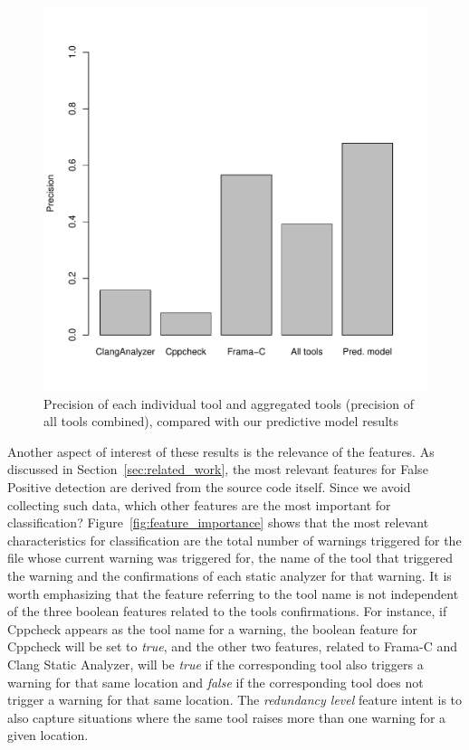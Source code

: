 \begin{figure}
\centering
\includegraphics[width=.75\textwidth]{figures/precisions.pdf}
  \caption{Precision of each individual tool and aggregated tools (precision of all tools combined), compared with our predictive model results}\label{fig:precisions}
\end{figure}

Another aspect of interest of these results is the relevance of the features.
As discussed in Section~\ref{sec:related_work}, the most relevant features for
False Positive detection are derived from the source code itself. Since we
avoid collecting such data, which other features are the most important for
classification?  Figure~\ref{fig:feature_importance} shows that the most
relevant characteristics for classification are the total number of warnings
triggered for the file whose current warning was triggered for, the name of the
tool that triggered the warning and the confirmations of each static analyzer
for that warning. It is worth emphasizing that the feature referring to the
tool name is not independent of the three boolean features related to the tools
confirmations. For instance, if Cppcheck appears as the tool name for a warning,
the boolean feature for Cppcheck will be set to \emph{true}, and the other two
features, related to Frama-C and Clang Static Analyzer, will be \emph{true} if
the corresponding tool also triggers a warning for that same location and
\emph{false} if the corresponding tool does not trigger a warning for that same
location. The \emph{redundancy level} feature intent is to also capture
situations where the same tool raises more than one warning for a given
location.

